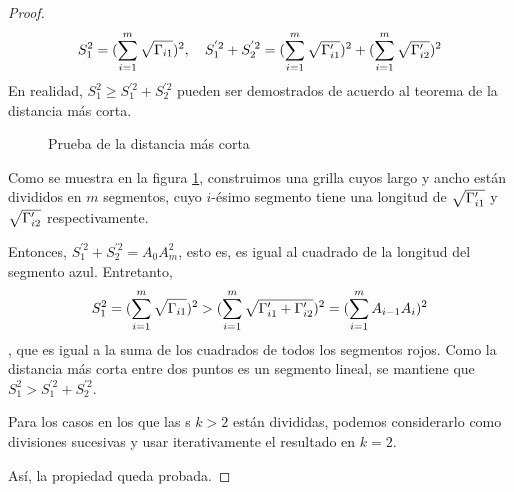 \begin{proof}
   	 $$S_1^2 = (\sum_{i=1}^m \sqrt{\Gamma_{i1}})^2,~~~S_1^{'2}+S_2^{'2}=  (\sum_{i=1}^m \sqrt{\Gamma'_{i1}})^2+(\sum_{i=1}^m \sqrt{\Gamma'_{i2}})^2$$
   	En realidad, $S_1^2 \geq S_1^{'2}+S_2^{'2}$ pueden ser demostrados de acuerdo al teorema de la distancia más corta.
   		 \begin{figure}
   		 	\centering
   		 	
   		 	\caption{Prueba de la distancia más corta\label{fig:path}}
   		 \end{figure}
   Como se muestra en la figura \ref{fig:path}, construimos una grilla cuyos largo y ancho están divididos en $m$ segmentos, cuyo $i$-ésimo segmento tiene una longitud de $\sqrt{\Gamma'_{i1}}$ y $\sqrt{\Gamma'_{i2}}$ respectivamente.

   	Entonces, $S_1^{'2}+S_2^{'2}=A_0A_m^2$, esto es, es igual al cuadrado de la longitud del segmento azul. Entretanto,
   	 $$S_1^2 = (\sum_{i=1}^m \sqrt{\Gamma_{i1}})^2 > (\sum_{i=1}^m \sqrt{\Gamma'_{i1}+\Gamma'_{i2}})^2 = (\sum_{i=1}^m A_{i-1}A_i)^2$$,
   	 que es igual a la suma de los cuadrados de todos los segmentos rojos. Como la distancia más corta entre dos puntos es un segmento lineal, se mantiene que $S_1^2 >S_1^{'2}+S_2^{'2}$.

   	 Para los casos en los que las {\dapp}s $k>2$ están divididas, podemos considerarlo como divisiones sucesivas y usar iterativamente el resultado en $k=2$.

   	 Así, la propiedad queda probada.

\end{proof}

